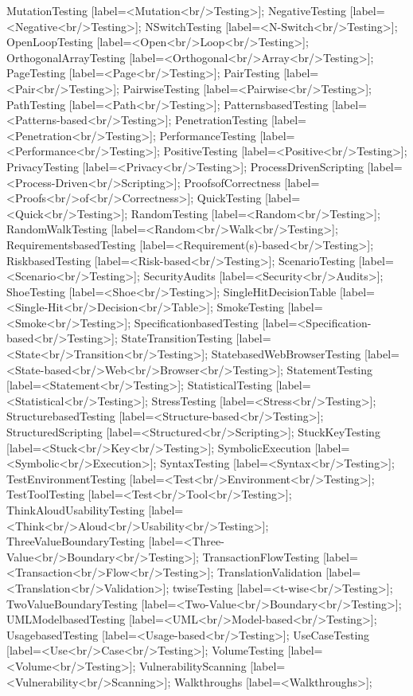 \documentclass{article}
\begin{document}
{MutationTesting [label=<Mutation<br/>Testing>];
NegativeTesting [label=<Negative<br/>Testing>];
NSwitchTesting [label=<N-Switch<br/>Testing>];
OpenLoopTesting [label=<Open<br/>Loop<br/>Testing>];
OrthogonalArrayTesting [label=<Orthogonal<br/>Array<br/>Testing>];
PageTesting [label=<Page<br/>Testing>];
PairTesting [label=<Pair<br/>Testing>];
PairwiseTesting [label=<Pairwise<br/>Testing>];
PathTesting [label=<Path<br/>Testing>];
PatternsbasedTesting [label=<Patterns-based<br/>Testing>];
PenetrationTesting [label=<Penetration<br/>Testing>];
PerformanceTesting [label=<Performance<br/>Testing>];
PositiveTesting [label=<Positive<br/>Testing>];
PrivacyTesting [label=<Privacy<br/>Testing>];
ProcessDrivenScripting [label=<Process-Driven<br/>Scripting>];
ProofsofCorrectness [label=<Proofs<br/>of<br/>Correctness>];
QuickTesting [label=<Quick<br/>Testing>];
RandomTesting [label=<Random<br/>Testing>];
RandomWalkTesting [label=<Random<br/>Walk<br/>Testing>];
RequirementsbasedTesting [label=<Requirement(s)-based<br/>Testing>];
RiskbasedTesting [label=<Risk-based<br/>Testing>];
ScenarioTesting [label=<Scenario<br/>Testing>];
SecurityAudits [label=<Security<br/>Audits>];
ShoeTesting [label=<Shoe<br/>Testing>];
SingleHitDecisionTable [label=<Single-Hit<br/>Decision<br/>Table>];
SmokeTesting [label=<Smoke<br/>Testing>];
SpecificationbasedTesting [label=<Specification-based<br/>Testing>];
StateTransitionTesting [label=<State<br/>Transition<br/>Testing>];
StatebasedWebBrowserTesting [label=<State-based<br/>Web<br/>Browser<br/>Testing>];
StatementTesting [label=<Statement<br/>Testing>];
StatisticalTesting [label=<Statistical<br/>Testing>];
StressTesting [label=<Stress<br/>Testing>];
StructurebasedTesting [label=<Structure-based<br/>Testing>];
StructuredScripting [label=<Structured<br/>Scripting>];
StuckKeyTesting [label=<Stuck<br/>Key<br/>Testing>];
SymbolicExecution [label=<Symbolic<br/>Execution>];
SyntaxTesting [label=<Syntax<br/>Testing>];
TestEnvironmentTesting [label=<Test<br/>Environment<br/>Testing>];
TestToolTesting [label=<Test<br/>Tool<br/>Testing>];
ThinkAloudUsabilityTesting [label=<Think<br/>Aloud<br/>Usability<br/>Testing>];
ThreeValueBoundaryTesting [label=<Three-Value<br/>Boundary<br/>Testing>];
TransactionFlowTesting [label=<Transaction<br/>Flow<br/>Testing>];
TranslationValidation [label=<Translation<br/>Validation>];
twiseTesting [label=<t-wise<br/>Testing>];
TwoValueBoundaryTesting [label=<Two-Value<br/>Boundary<br/>Testing>];
UMLModelbasedTesting [label=<UML<br/>Model-based<br/>Testing>];
UsagebasedTesting [label=<Usage-based<br/>Testing>];
UseCaseTesting [label=<Use<br/>Case<br/>Testing>];
VolumeTesting [label=<Volume<br/>Testing>];
VulnerabilityScanning [label=<Vulnerability<br/>Scanning>];
Walkthroughs [label=<Walkthroughs>];

}
\end{document}
